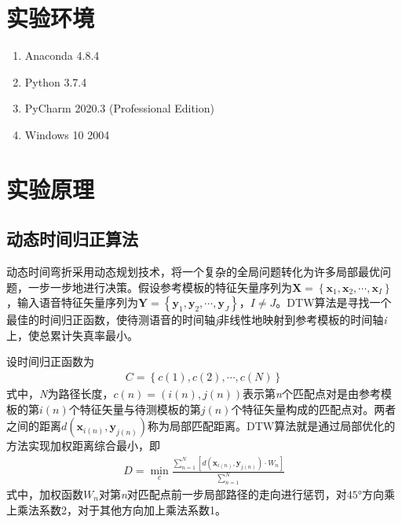 \documentclass{hitreport}
\begin{document}
\section{实验环境}

\begin{enumerate}
\item Anaconda 4.8.4
\item Python 3.7.4
\item PyCharm 2020.3 (Professional Edition)
\item Windows 10 2004
\end{enumerate}

\section{实验原理}

\subsection{动态时间归正算法}\label{sec:energy}


动态时间弯折采用动态规划技术，将一个复杂的全局问题转化为许多局部最优问题，一步一步地进行决策。\cite{韩纪庆2019}假设参考模板的特征矢量序列为$\boldsymbol{X} = \left\{\boldsymbol{x}_1, \boldsymbol{x}_2, \cdots, \boldsymbol{x}_I\right\}$，输入语音特征矢量序列为$\boldsymbol{Y} = \left\{\boldsymbol{y}_1, \boldsymbol{y}_2, \cdots, \boldsymbol{y}_J\right\}$，$I\ne J$。DTW算法是寻找一个最佳的时间归正函数，使待测语音的时间轴\textit{j}非线性地映射到参考模板的时间轴\textit{i}上，使总累计失真率最小。

设时间归正函数为
\begin{align}
C=\left\{c\left(1\right), c\left(2\right), \cdots, c\left(N\right)\right\}
\end{align}
式中，\textit{N}为路径长度，$c\left(n\right)=\left(i\left(n\right),j\left(n\right)\right)$表示第\textit{n}个匹配点对是由参考模板的第$i\left(n\right)$个特征矢量与待测模板的第$j\left(n\right)$个特征矢量构成的匹配点对。两者之间的距离$d\left(\boldsymbol{x}_{i\left(n\right)}, \boldsymbol{y}_{j\left(n\right)}\right)$称为局部匹配距离。DTW算法就是通过局部优化的方法实现加权距离综合最小，即
\begin{align}
D = \underset{c}{\min} \frac{\sum\limits_{n=1}^{N}\left[d\left(\boldsymbol{x}_{i\left(n\right)}, \boldsymbol{y}_{j\left(n\right)}\right) \cdot W_n\right]}{\sum\limits_{n=1}^{N}}
\end{align}
式中，加权函数$W_n$对第\textit{n}对匹配点前一步局部路径的走向进行惩罚，对$45°$方向乘上乘法系数2，对于其他方向加上乘法系数1。
\end{document}
